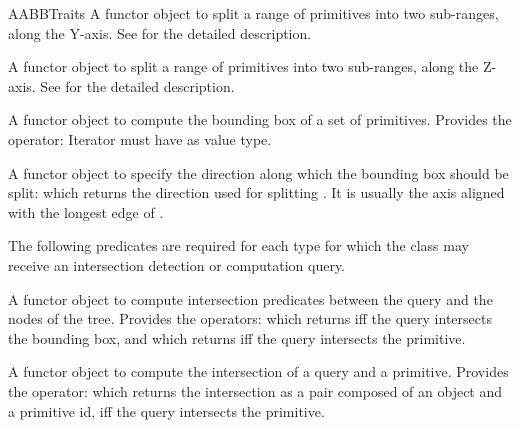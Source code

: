 \begin{ccRefConcept}{AABBTraits}
{A functor object to split a range of primitives into two sub-ranges, along the Y-axis. See  for the detailed description.}

{A functor object to split a range of primitives into two sub-ranges, along the Z-axis. See  for the detailed description.}

{A functor object to compute the bounding box of a set of primitives. Provides the operator:
 Iterator  must have  as value type. }

{A functor object to specify the direction along which the bounding box should be split:
 which returns the direction used for splitting . It is usually the axis aligned with the longest edge of .}

The following predicates are required for each type 
for which the class  may receive an intersection detection or computation query.

{} 
{A functor object to compute intersection predicates between the query and the nodes of the tree. Provides the operators:
 which returns  iff the query intersects the bounding box, and  which returns  iff the query intersects the primitive.}

{} 
{A functor object to compute the intersection of a query and a primitive. Provides the operator:
 which returns the intersection as a pair composed of an object and a primitive id, iff the query intersects the primitive.}


\end{ccRefConcept}
